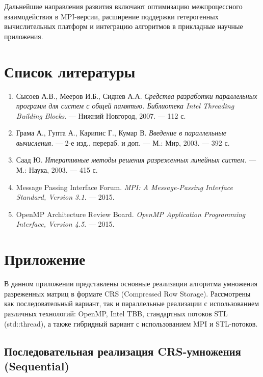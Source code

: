 \documentclass[a4paper,12pt]{article}
\begin{document}
Дальнейшие направления развития включают оптимизацию межпроцессного взаимодействия в MPI-версии, расширение поддержки гетерогенных вычислительных платформ и интеграцию алгоритмов в прикладные научные приложения.

\newpage

\section{Список литературы}

\begin{enumerate}
    \item Сысоев А.В., Мееров И.Б., Сиднев А.А. \textit{Средства разработки параллельных программ для систем с общей памятью. Библиотека Intel Threading Building Blocks}. — Нижний Новгород, 2007. — 112 с.
    \item Грама А., Гупта А., Карипис Г., Кумар В. \textit{Введение в параллельные вычисления}. — 2-е изд., перераб. и доп. — М.: Мир, 2003. — 392 с.
    \item Саад Ю. \textit{Итеративные методы решения разреженных линейных систем}. — М.: Наука, 2003. — 415 с.
    \item Message Passing Interface Forum. \textit{MPI: A Message-Passing Interface Standard, Version 3.1}. — 2015.
    \item OpenMP Architecture Review Board. \textit{OpenMP Application Programming Interface, Version 4.5}. — 2015.
\end{enumerate}

\newpage

\section{Приложение}

В данном приложении представлены основные реализации алгоритма умножения разреженных матриц в формате CRS (Compressed Row Storage). Рассмотрены как последовательный вариант, так и параллельные реализации с использованием различных технологий: OpenMP, Intel TBB, стандартных потоков STL (std::thread), а также гибридный вариант с использованием MPI и STL-потоков.

\subsection{Последовательная реализация CRS-умножения (Sequential)}
\end{document}
